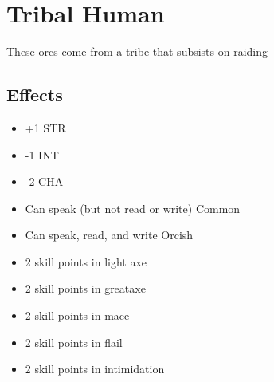 \section{Tribal Human}\label{culture:tribal-human}
These orcs come from a tribe that subsists on raiding

\subsection{Effects}
\begin{itemize}
    \item +1 STR
    \item -1 INT
    \item -2 CHA
    \item Can speak (but not read or write) Common
    \item Can speak, read, and write Orcish
    \item 2 skill points in light axe
    \item 2 skill points in greataxe
    \item 2 skill points in mace
    \item 2 skill points in flail
    \item 2 skill points in intimidation
\end{itemize}
